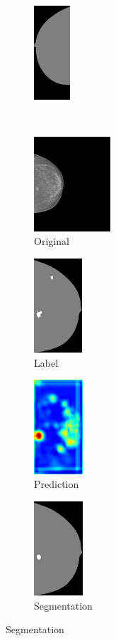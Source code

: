\documentclass{beamer}
\begin{document}
\begin{frame}
\begin{figure}[h]
			\begin{subfigure}{0.22\textwidth}
				\centering
					\includegraphics[height=3.5cm]{plots/segmentation_ex1_v3.png}
			\end{subfigure}%
			\\
			\begin{subfigure}{0.25\textwidth}
				\centering
					\includegraphics[height = 3.5cm]{plots/mammogram_ex2.png}
				\caption{Original}
			\end{subfigure}
			\begin{subfigure}{0.16\textwidth}
				\centering
					\includegraphics[height = 3.5cm]{plots/label_ex2.png}
				\caption{Label}
			\end{subfigure}
			\begin{subfigure}{0.17\textwidth}
				\centering
					\includegraphics[height = 3.5cm]{plots/logits_ex2_v3.png}
				\caption{Prediction}
			\end{subfigure}
			\begin{subfigure}{0.22\textwidth}
				\centering
					\includegraphics[height = 3.5cm]{plots/segmentation_ex2_v3.png}
				\caption{Segmentation}
			\end{subfigure}%
		\end{figure}		
	\end{frame}
	
\end{document}
